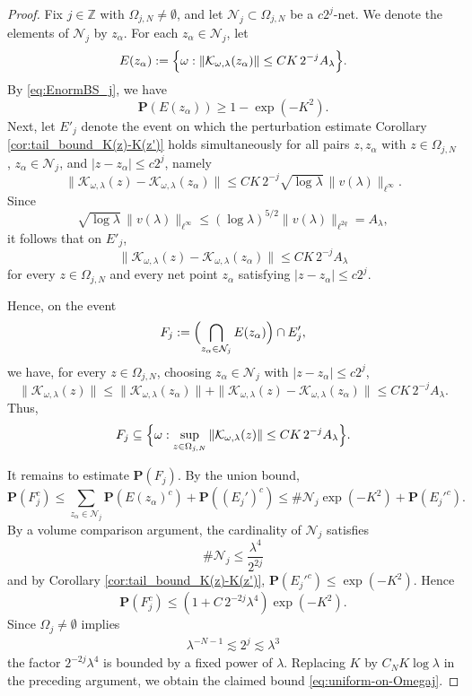 \documentclass[12pt,reqno]{amsart}
\theoremstyle{definition}
\theoremstyle{remark}
\numberwithin{equation}{section}
\newcommand{\1}{\mathbbm{1}}
\begin{document}
\begin{proof}
Fix \(j\in \mathbb Z\) with \(\Omega_{j,N}\neq \emptyset\), and let
\(\mathcal N_j\subset \Omega_{j,N}\) be a \(c2^j\)-net. We denote the
elements of \(\mathcal N_j\) by \(z_\alpha\). For each \(z_\alpha\in \mathcal N_j\), let
\[
E(z_\alpha)
:=
\Bigl\{
\omega:
\|\mathcal K_{\omega,\lambda}(z_\alpha)\|
\leq
CK\,2^{-j}A_\lambda
\Bigr\}.
\]
By \eqref{eq:EnormBS_j}, we have
\[
\mathbf P(E(z_\alpha))\geq 1-\exp(-K^2).
\]
Next, let \(E'_j\) denote the event on which the perturbation estimate Corollary \ref{cor:tail_bound_K(z)-K(z')} holds simultaneously for all pairs \(z,z_\alpha\) with
\(z\in \Omega_{j,N}\), \(z_\alpha\in\mathcal N_j\), and
\(|z-z_\alpha|\leq c2^j\), namely
\[
\|\mathcal K_{\omega,\lambda}(z)-\mathcal K_{\omega,\lambda}(z_\alpha)\|
\leq
CK\,2^{-j}\sqrt{\log\lambda}\,\|v(\lambda)\|_{\ell^\infty}.
\]
Since
\[
\sqrt{\log\lambda}\,\|v(\lambda)\|_{\ell^\infty}
\leq
(\log\lambda)^{5/2}\|v(\lambda)\|_{\ell^{2q}}
=
A_\lambda,
\]
it follows that on \(E'_j\),
\[
\|\mathcal K_{\omega,\lambda}(z)-\mathcal K_{\omega,\lambda}(z_\alpha)\|
\leq
CK\,2^{-j}A_\lambda
\]
for every \(z\in \Omega_{j,N}\) and every net point \(z_\alpha\) satisfying
\(|z-z_\alpha|\leq c2^j\).

Hence, on the event
\[
F_j:=\Bigl(\bigcap_{z_\alpha\in\mathcal N_j}E(z_\alpha)\Bigr)\cap E'_j,
\]
we have, for every \(z\in \Omega_{j,N}\), choosing \(z_\alpha\in \mathcal N_j\) with
\(|z-z_\alpha|\leq c2^j\),
\[
\|\mathcal K_{\omega,\lambda}(z)\|
\leq
\|\mathcal K_{\omega,\lambda}(z_\alpha)\|
+
\|\mathcal K_{\omega,\lambda}(z)-\mathcal K_{\omega,\lambda}(z_\alpha)\|
\leq
CK\,2^{-j}A_\lambda.
\]
Thus,
\[
F_j\subseteq
\Bigl\{
\omega:
\sup_{z\in \Omega_{j,N}}\|\mathcal K_{\omega,\lambda}(z)\|
\leq
CK\,2^{-j}A_\lambda
\Bigr\}.
\]

It remains to estimate \(\mathbf P(F_j)\). By the union bound,
\[
\mathbf P(F_j^c)
\leq
\sum_{z_\alpha\in \mathcal N_j}\mathbf P(E(z_\alpha)^c)
+\mathbf P((E_j')^c)
\leq
\#\mathcal N_j\exp(-K^2)+\mathbf P(E_j'^c).
\]
By a volume comparison argument, the cardinality of \(\mathcal N_j\) satisfies 
\[
\#\mathcal N_j\leq \frac{\lambda^4}{2^{2j}}
\]
and by Corollary \ref{cor:tail_bound_K(z)-K(z')}, $\mathbf P(E_j'^c)\leq \exp(-K^2)$.
Hence
\[
\mathbf P(F_j^c)
\leq
(1+C\,2^{-2j}\lambda^4) \exp(-K^2).
\]
Since \(\Omega_j\neq \emptyset\) implies 
\begin{align}\label{eq:2j_poly_bounded}
\lambda^{-N-1}\lesssim 2^j\lesssim \lambda^3  
\end{align}
the factor \(2^{-2j}\lambda^4\) is bounded by a fixed power of
\(\lambda\). Replacing \(K\) by \(C_NK\log\lambda\) in the preceding argument, we
obtain the claimed bound \eqref{eq:uniform-on-Omegaj}.
\end{proof}
\end{document}
